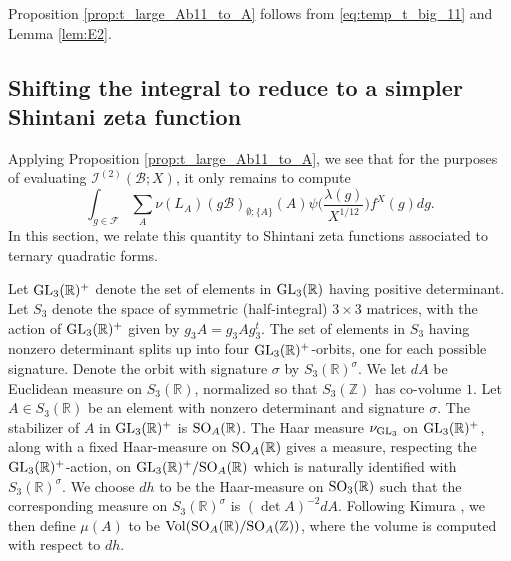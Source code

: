 \documentclass{article}
\def\Z{{\mathbb Z}}
\def\GL{{\rm GL}}
\def\SO{{\rm SO}}
\def\Vol{{\rm Vol}}
\def\R{{\mathbb R}}
\def\cB{{\mathcal B}}
\def\FF{{\mathcal F}}
\def\Z{{\mathbb Z}}
\def\I{{\mathcal I}}
\begin{document}
Proposition \ref{prop:t_large_Ab11_to_A} follows from \eqref{eq:temp_t_big_11} and Lemma \ref{lem:E2}.



\subsection{Shifting the integral to reduce to a simpler Shintani zeta function}

Applying Proposition \ref{prop:t_large_Ab11_to_A}, we see that for the purposes of evaluating $\I^{(2)}(\cB;X)$, it only remains to compute
\begin{equation}\label{eq:final_before_simpleShintani}
\int_{g\in\FF}\sum_{A}\nu(L_{A})(g\cB)_{\emptyset;\{A\}}(A)\psi\Big(\frac{\lambda(g)}{X^{1/12}}\Big)f^X(g)dg.
\end{equation}
In this section, we relate this quantity to Shintani zeta functions associated to ternary quadratic forms.

Let $\GL_3(\R)^+$ denote the set of elements in $\GL_3(\R)$ having positive determinant. Let $S_3$ denote the space of symmetric (half-integral) $3\times 3$ matrices, with the action of $\GL_3(\R)^+$ given by $g_3A=g_3Ag_3^t$. The set of elements in $S_3$ having nonzero determinant splits up into four $\GL_3(\R)^+$-orbits, one for each possible signature. Denote the orbit with signature $\sigma$ by $S_3(\R)^\sigma$. We let $dA$ be Euclidean measure on $S_3(\R)$, normalized so that $S_3(\Z)$ has co-volume $1$. Let $A\in S_3(\R)$ be an element with nonzero determinant and signature $\sigma$. The stabilizer of $A$ in $\GL_3(\R)^+$ is $\SO_A(\R)$. The Haar measure $\nu_{\GL_3}$ on $\GL_3(\R)^+$, along with a fixed Haar-measure on $\SO_A(\R)$ gives a measure, respecting the $\GL_3(\R)^+$-action, on $\GL_3(\R)^+/\SO_A(\R)$ which is naturally identified with $S_3(\R)^\sigma$. We choose $dh$ to be the Haar-measure on $\SO_3(\R)$ such that the corresponding measure on $S_3(\R)^\sigma$ is $(\det A)^{-2}dA$. Following Kimura \cite[p.163]{Kimura_book}, we then define $\mu(A)$ to be $\Vol(\SO_A(\R)/\SO_A(\Z))$, where the volume is computed with respect to $dh$.
\end{document}
